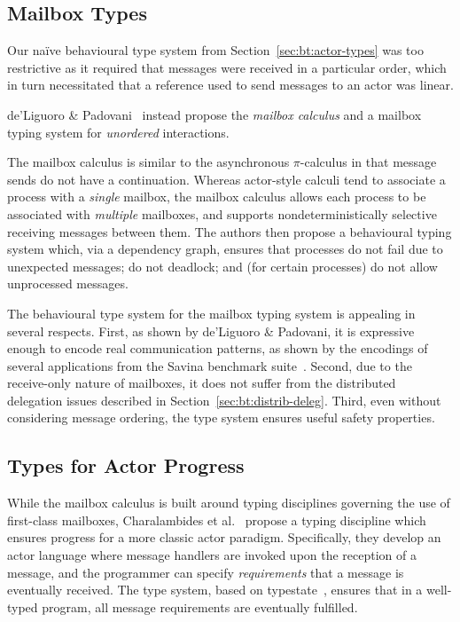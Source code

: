 \documentclass[
graybox,
envcountchap
]{svmult}
\begin{document}
\begin{bibunit}
  \subsection{Mailbox Types}
  Our na\"ive behavioural type system from Section~\ref{sec:bt:actor-types} was too
  restrictive as it required that messages were received in a particular order,
  which in turn necessitated that a reference used to send messages to an actor
  was linear.

  de'Liguoro \& Padovani~\cite{deLiguoroP18:mailbox} instead propose the \emph{mailbox calculus}
  and a mailbox typing system for \emph{unordered} interactions.

  The mailbox calculus is similar to the asynchronous $\pi$-calculus in that
  message sends do not have a continuation. Whereas actor-style calculi tend to
  associate a process with a \emph{single} mailbox, the mailbox calculus allows
  each process to be associated with \emph{multiple} mailboxes, and supports
  nondeterministically selective receiving messages between them.
  The authors then propose a behavioural typing system which, via a
  dependency graph, ensures that processes do not fail due to unexpected
  messages; do not deadlock; and (for certain processes) do not allow
  unprocessed messages.

  The behavioural type system for the mailbox typing system is appealing in
  several respects. First, as shown by de'Liguoro \& Padovani, it is expressive
  enough to encode real communication patterns, as shown by the encodings of
  several applications from the Savina benchmark suite~\cite{ImamS14:savina}. Second, due
  to the receive-only nature of mailboxes, it does not suffer from the
  distributed delegation issues described in Section~\ref{sec:bt:distrib-deleg}.
  Third, even without considering message ordering, the type system ensures
  useful safety properties.

  \subsection{Types for Actor Progress}
  While the mailbox calculus is built around typing disciplines governing the
  use of first-class mailboxes, Charalambides et
  al.~\cite{CharalambidesPA19:actor-progress} propose a typing discipline which
  ensures progress for a more classic actor paradigm.
  Specifically, they develop an actor language where message handlers are
  invoked upon the reception of a message, and the programmer can specify
  \emph{requirements} that a message is eventually received. The type system,
  based on typestate~\cite{StromY86:typestate}, ensures that in a well-typed
  program, all message requirements are eventually fulfilled.


\end{bibunit}
\end{document}
